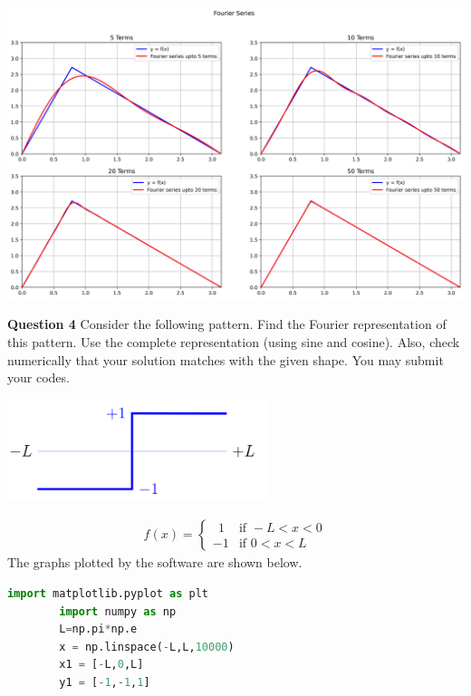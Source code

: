 \documentclass[addpoints]{exam}
\begin{document}
\begin{questions}
\begin{solution}
    \includegraphics[width = 6.0in]{output_6_0.png}
\end{solution}
\newpage
\question \textbf{ Question 4}
Consider the following pattern. Find the Fourier representation of this pattern. Use the
complete representation (using sine and cosine). Also, check numerically that your solution
matches with the given shape. You may submit your codes.\\
\begin{center}
    \includegraphics[width = 3.0in]{q4.png}
\end{center}
\begin{solution}
    \begin{align*}
        f(x) =
        \begin{cases}
            ~\ 1 & \text{if } -L<x<0 \\
            -1 & \text{if } 0<x<L
        \end{cases}
    \end{align*}
    The graphs plotted by the software are shown below.
    \begin{lstlisting}[language = python]
        import matplotlib.pyplot as plt
        import numpy as np
        L=np.pi*np.e
        x = np.linspace(-L,L,10000)
        x1 = [-L,0,L]
        y1 = [-1,-1,1]


\end{lstlisting}
\end{solution}
\end{questions}
\end{document}
